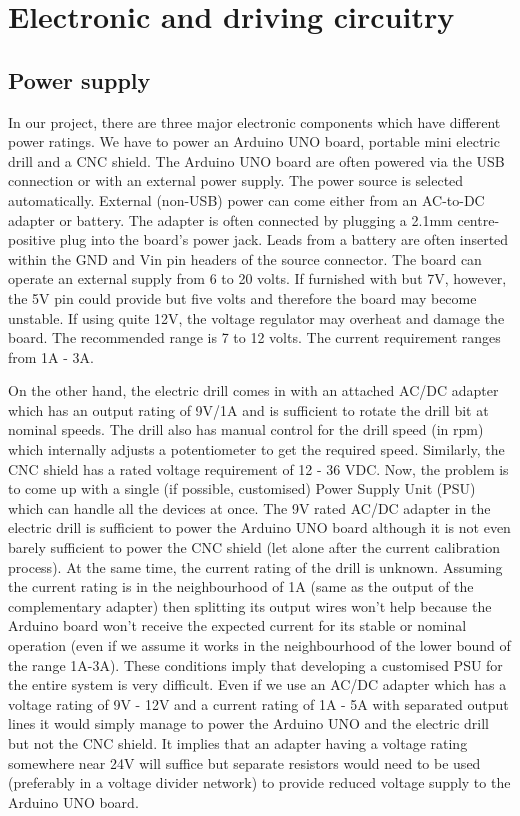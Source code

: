 \chapter{Electronic and driving circuitry}

\section{Power supply}

In our project, there are three major electronic components which have different power ratings. We have to power an Arduino UNO board, portable mini electric drill and a CNC shield. The Arduino UNO board are often powered via the USB connection or with an external power supply. The power source is selected automatically. External (non-USB) power can come either from an AC-to-DC adapter or battery. The adapter is often connected by plugging a 2.1mm centre-positive plug into the board's power jack. Leads from a battery are often inserted within the GND and Vin pin headers of the source connector. The board can operate an external supply from 6 to 20 volts. If furnished with but  7V, however, the 5V pin could provide but five volts and therefore the board may become unstable. If using quite 12V, the voltage regulator may overheat and damage the board. The recommended range is 7 to 12 volts. The current requirement ranges from 1A - 3A. \par

On the other hand, the electric drill comes in with an attached AC/DC adapter which has an output rating of 9V/1A and is sufficient to rotate the drill bit at nominal speeds. The drill also has manual control for the drill speed (in rpm) which internally adjusts a potentiometer to get the required speed. Similarly, the CNC shield has a rated voltage requirement of 12 - 36 VDC. Now, the problem is to come up with a single (if possible, customised) Power Supply Unit (PSU) which can handle all the devices at once. The 9V rated AC/DC adapter in the electric drill is sufficient to power the Arduino UNO board although it is not even barely sufficient to power the CNC shield (let alone after the current calibration process). At the same time, the current rating of the drill is unknown. Assuming the current rating is in the neighbourhood of 1A (same as the output of the complementary adapter) then splitting its output wires won’t help because the Arduino board won’t receive the expected current for its stable or nominal operation (even if we assume it works in the neighbourhood of the lower bound of the range 1A-3A). These conditions imply that developing a customised PSU for the entire system is very difficult. Even if we use an AC/DC adapter which has a voltage rating of 9V - 12V and a current rating of 1A - 5A with separated output lines it would simply manage to power the Arduino UNO and the electric drill but not the CNC shield. It implies that an adapter having a voltage rating somewhere near 24V will suffice but separate resistors would need to be used (preferably in a voltage divider network) to provide reduced voltage supply to the Arduino UNO board. \par

